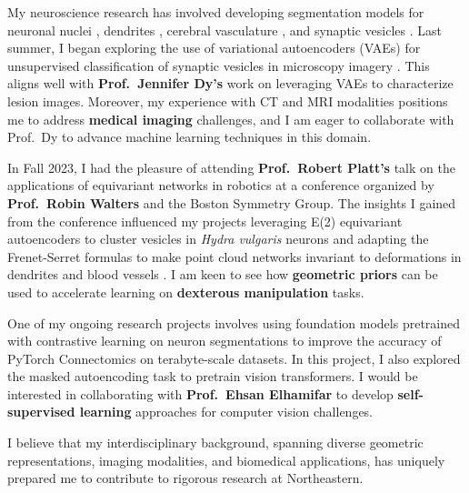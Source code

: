 \documentclass[letterpaper,11pt]{article}
\begin{document}
My neuroscience research has involved developing segmentation models for neuronal nuclei , dendrites , cerebral vasculature , and synaptic vesicles . Last summer, I began exploring the use of variational autoencoders (VAEs) for unsupervised classification of synaptic vesicles in microscopy imagery . This aligns well with \textbf{Prof.\ Jennifer Dy’s} work on leveraging VAEs to characterize lesion images. Moreover, my experience with CT and MRI modalities  positions me to address \textbf{medical imaging} challenges, and I am eager to collaborate with Prof.\ Dy to advance machine learning techniques in this domain.

In Fall 2023, I had the pleasure of attending \textbf{Prof.\ Robert Platt's} talk on the applications of equivariant networks in robotics at a conference organized by \textbf{Prof.\ Robin Walters} and the Boston Symmetry Group. The insights I gained from the conference influenced my projects leveraging E(2) equivariant autoencoders to cluster vesicles in \textit{Hydra vulgaris} neurons  and adapting the Frenet-Serret formulas to make point cloud networks invariant to deformations in dendrites and blood vessels . I am keen to see how \textbf{geometric priors} can be used to accelerate learning on \textbf{dexterous manipulation} tasks.

One of my ongoing research projects involves using foundation models pretrained with contrastive learning on neuron segmentations to improve the accuracy of PyTorch Connectomics on terabyte-scale datasets. In this project, I also explored the masked autoencoding task to pretrain vision transformers. I would be interested in collaborating with \textbf{Prof.\ Ehsan Elhamifar} to develop \textbf{self-supervised learning} approaches for computer vision challenges.

I believe that my interdisciplinary background, spanning diverse geometric representations, imaging modalities, and biomedical applications, has uniquely prepared me to contribute to rigorous research at Northeastern.
\end{document}
